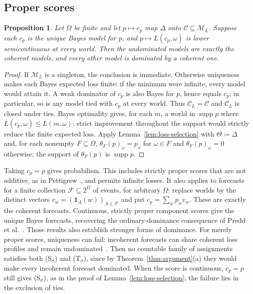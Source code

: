 \documentclass[11pt]{article}
\newtheorem{proposition}[theorem]{Proposition}
\theoremstyle{definition}
\theoremstyle{remark}
\newcommand{\M}{\mathcal M}
\newcommand{\C}{\mathcal C}
\newcommand{\supp}{\operatorname{supp}}
\begin{document}
\subsection{Proper scores}
\begin{proposition}\label{prop:short-proper}
Let $\Omega$ be finite and let $p\mapsto c_p$ map $\Delta$ onto $\C\subseteq\M_L$. Suppose each $c_p$ is the unique Bayes model for $p$, and $p\mapsto L(c_p,\omega)$ is lower semicontinuous at every world. Then the undominated models are exactly the coherent models, and every other model is dominated by a coherent one.
\end{proposition}
\begin{proof}
If $\M_L$ is a singleton, the conclusion is immediate. Otherwise uniqueness makes each Bayes expected loss finite: if the minimum were infinite, every model would attain it. {\color{red}A weak dominator of $c_p$ is also Bayes for $p$, hence equals $c_p$; in particular, so is any model tied with $c_p$ at every world. Thus $\C_L=\C$ and $\C_L$ is closed under ties. Bayes optimality gives, for each $m$, a world in $\supp p$ where $L(c_p,\omega)\le L(m,\omega)$: strict improvement throughout the support would strictly reduce the finite expected loss. Apply Lemma~\ref{lem:loss-selection} with $\Theta\coloneqq\Delta$ and, for each nonempty $F\subseteq\Omega$, $\theta_F(p)_\omega=p_\omega$ for $\omega\in F$ and $\theta_F(p)_\omega=0$ otherwise; the support of $\theta_F(p)$ is $\supp p$.}
\end{proof}
Taking $c_p=p$ gives probabilism. This includes strictly proper scores that are not additive, as in Pettigrew~\cite{Pettigrew2022}, and permits infinite losses. It also applies to forecasts for a finite collection $\mathcal F\subseteq2^\Omega$ of events, for arbitrary $\Omega$: replace worlds by the distinct vectors $v_w=(\mathbf1_A(w))_{A\in\mathcal F}$ and put $c_p=\sum_wp_wv_w$. These are exactly the coherent forecasts. Continuous, strictly proper component scores give the unique Bayes forecasts, recovering the ordinary-dominance consequence of Predd et al.~\cite{Predd2009}. Those results also establish stronger forms of dominance. For merely proper scores, uniqueness can fail: incoherent forecasts can share coherent loss profiles and remain undominated~\cite{SSK2009}. {\color{red}Then no countable family of assignments satisfies both (S$_\sigma$) and (T$_\sigma$), since by Theorem~\ref{thm:argument}(a) they would make every incoherent forecast dominated. When the score is continuous, $c_p=p$ still gives (S$_\sigma$), as in the proof of Lemma~\ref{lem:loss-selection}; the failure lies in the exclusion of ties.}
\end{document}
